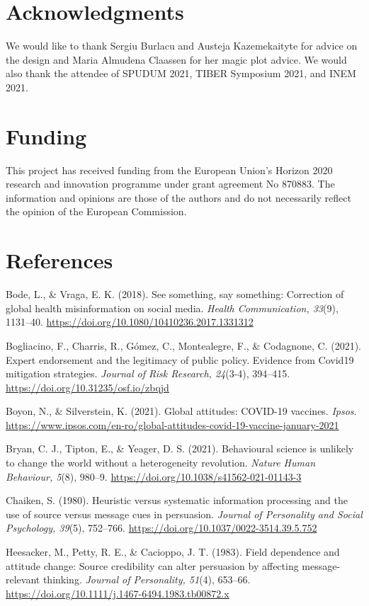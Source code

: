 \documentclass[authordate, empirical]{jote-new-article}
\begin{document}
\section{Acknowledgments}



We would like to thank Sergiu Burlacu and Austeja Kazemekaityte for advice on the design and Maria Almudena Claassen for her magic plot advice. We would also thank the attendee of SPUDUM 2021, TIBER Symposium 2021, and INEM 2021.


\section{Funding}
This project has received funding from the European Union's Horizon 2020 research and innovation programme under grant agreement No 870883. The information and opinions are those of the authors and do not necessarily reflect the opinion of the European Commission.

\section{References}

Bode, L., \& Vraga, E. K. (2018). See something, say something: Correction of global health misinformation on social media. \emph{Health Communication, 33}(9), 1131–40. \url{https://doi.org/10.1080/10410236.2017.1331312}

Bogliacino, F., Charris, R., Gómez, C., Montealegre, F., \& Codagnone, C. (2021). Expert endorsement and the legitimacy of public policy. Evidence from Covid19 mitigation strategies. \emph{Journal of Risk Research, 24}(3-4), 394–415. \url{https://doi.org/10.31235/osf.io/zbqjd}

Boyon, N., \& Silverstein, K. (2021). Global attitudes: COVID-19 vaccines. \emph{Ipsos}. \url{https://www.ipsos.com/en-ro/global-attitudes-covid-19-vaccine-january-2021}

Bryan, C. J., Tipton, E., \& Yeager, D. S. (2021). Behavioural science is unlikely to change the world without a heterogeneity revolution. \emph{Nature Human Behaviour, 5}(8), 980–9. \url{https://doi.org/10.1038/s41562-021-01143-3}

Chaiken, S. (1980). Heuristic versus systematic information processing and the use of source versus message cues in persuasion. \emph{Journal of Personality and Social Psychology, 39}(5), 752–766. \url{https://doi.org/10.1037/0022-3514.39.5.752}

Heesacker, M., Petty, R. E., \& Cacioppo, J. T. (1983). Field dependence and attitude change: Source credibility can alter persuasion by affecting message-relevant thinking. \emph{Journal of Personality, 51}(4), 653–66. \url{https://doi.org/10.1111/j.1467-6494.1983.tb00872.x}
\end{document}
